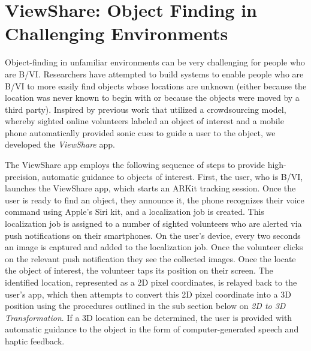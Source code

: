 \documentclass[chi_draft]{sigchi}
\newcommand{\BVI}{B/VI\xspace}
\begin{document}
\section{ViewShare: Object Finding in Challenging Environments}

Object-finding in unfamiliar environments can be very challenging for people who are \BVI {}.  Researchers have attempted to build systems to enable people who are \BVI to more easily find objects whose locations are unknown (either because the location was never known to begin with or because the objects were moved by a third party).  Inspired by previous work \cite{bigham2010vizwizlocateit} that utilized a crowdsourcing model, whereby sighted online volunteers labeled an object of interest and a mobile phone automatically provided sonic cues to guide a user to the object, we developed the \emph{ViewShare} app.

The ViewShare app employs the following sequence of steps to provide high-precision, automatic guidance to objects of interest.  First, the user, who is \BVI, launches the ViewShare app, which starts an ARKit tracking session.  Once the user is ready to find an object, they announce it, the phone recognizes their voice command using Apple's Siri kit, and a localization job is created.  This localization job is assigned to a number of sighted volunteers who are alerted via push notifications on their smartphones.  On the user's device, every two seconds an image is captured and added to the localization job.  Once the volunteer clicks on the relevant push notification they see the collected images.  Once the locate the object of interest, the volunteer taps its position on their screen.  The identified location, represented as a 2D pixel coordinates, is relayed back to the user's app, which then attempts to convert this 2D pixel coordinate into a 3D position using the procedures outlined in the sub section below on \emph{2D to 3D Transformation}.  If a 3D location can be determined, the user is provided with automatic guidance to the object in the form of computer-generated speech and haptic feedback.
\end{document}

